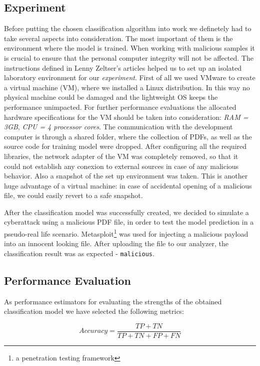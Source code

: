 \subsection{Experiment}
Before putting the chosen classification algorithm into work we definetely had to take several aspects into consideration. The most important of them is the environment where the model is trained. When working with malicious samples it is crucial to ensure that the personal computer integrity will not be affected. The instructions defined in Lenny Zeltser's articles \cite{zeltser} helped us to set up an isolated laboratory environment for our \textit{experiment}. First of all we used VMware to create a virtual machine (VM), where we installed a Linux distribution. In this way no physical machine could be damaged and the lightweight OS keeps the performance unimpacted. For further performance evaluations the allocated hardware specifications for the VM should be taken into consideration: \textit{RAM = 3GB}, \textit{CPU = 4 processor cores}. The communication with the development computer is through a shared folder, where the collection of PDFs, as well as the source code for training model were dropped. After configuring all the required libraries, the network adapter of the VM was completely removed, so that it could not establish any conexion to external sources in case of any malicious behavior. Also a snapshot of the set up environment was taken. This is another huge advantage of a virtual machine: in case of accidental opening of a malicious file, we could easily revert to a safe snapshot. \par 
After the classification model was successfully created, we decided to simulate a cyberattack using a malicious PDF file, in order to test the model prediction in a pseudo-real life scenario. Metasploit\footnote{a penetration testing framework} was used for injecting a malicious payload into an innocent looking file. After uploading the file to our analyzer, the classification result was as expected - \texttt{malicious}.


\subsection{Performance Evaluation}
As performance estimators for evaluating the strengths of the obtained classification model we have selected the following metrics: 

\begin{equation}
	Accuracy = \frac{TP + TN}{TP + TN + FP + FN}
\end{equation}


